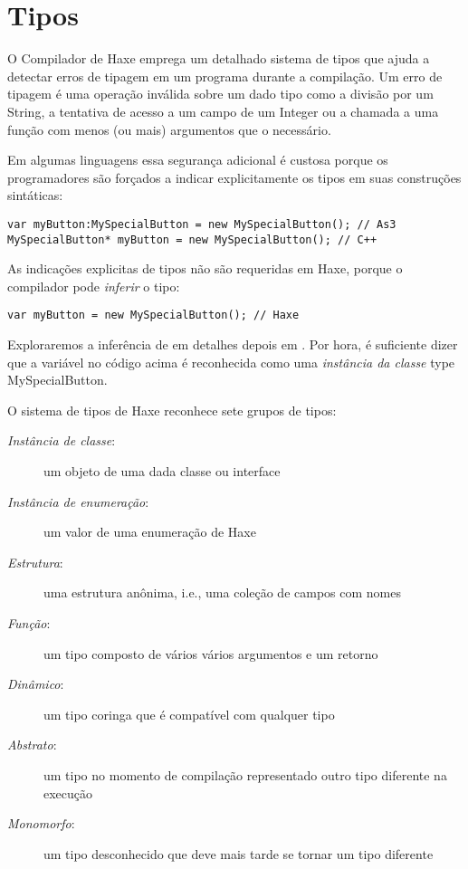 \chapter{Tipos}%
\label{types}%

O Compilador de Haxe emprega um detalhado sistema de tipos que ajuda a detectar erros de tipagem em um programa durante a compilação. Um erro de tipagem é uma operação inválida sobre um dado tipo como a divisão por um String, a tentativa de acesso a um campo de um Integer ou a chamada a uma função com menos (ou mais) argumentos que o necessário.

Em algumas linguagens essa segurança adicional é custosa porque os programadores são forçados a indicar explicitamente os tipos em suas construções sintáticas:

\begin{lstlisting}
var myButton:MySpecialButton = new MySpecialButton(); // As3
MySpecialButton* myButton = new MySpecialButton(); // C++ 
\end{lstlisting}
As indicações explicitas de tipos não são requeridas em Haxe, porque o compilador pode \emph{inferir} o tipo:

\begin{lstlisting}
var myButton = new MySpecialButton(); // Haxe
\end{lstlisting}
Exploraremos a inferência de em detalhes depois em . Por hora, é suficiente dizer que a variável  no código acima é reconhecida como uma \emph{instância da classe} type{ MySpecialButton}.

O sistema de tipos de Haxe reconhece sete grupos de tipos:

\begin{description}
 \item[\emph{Instância de classe}:] um objeto de uma dada classe ou interface
 \item[\emph{Instância de enumeração}:] um valor de uma enumeração de Haxe 
 \item[\emph{Estrutura}:] uma estrutura anônima, i.e., uma coleção de campos com nomes
 \item[\emph{Função}:] um tipo composto de vários vários argumentos e um retorno
 \item[\emph{Dinâmico}:] um tipo coringa que é compatível com qualquer tipo
 \item[\emph{Abstrato}:] um tipo no momento de compilação representado outro tipo diferente na execução
 \item[\emph{Monomorfo}:] um tipo desconhecido que deve mais tarde se tornar um tipo diferente
\end{description}

